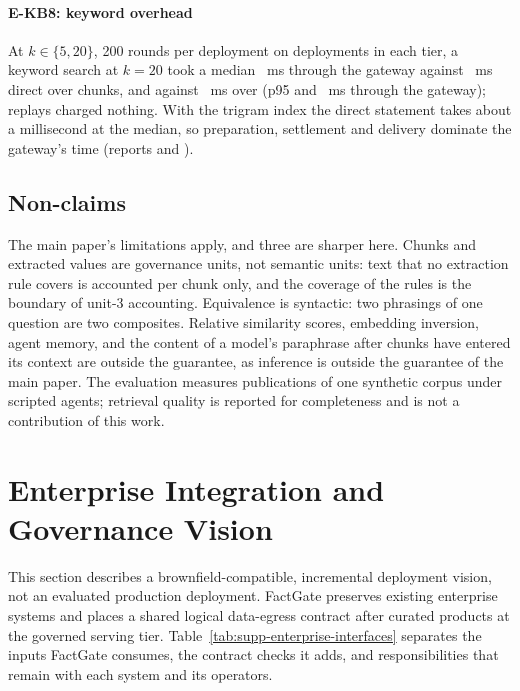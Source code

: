 \documentclass[journal,onecolumn]{IEEEtran}
\begin{document}
\paragraph{E-KB8: keyword overhead}
At $k\in\{5,20\}$, 200 rounds per deployment on \KbEkbEightFortyEightKDeployments{}
deployments in each tier, a keyword search at $k=20$ took a median
\KbEkbEightFortyEightKFactGateKTwentyNovelPFifty~ms through the gateway
against \KbEkbEightFortyEightKDirectKTwentyNovelPFifty~ms direct over
\KbEkbEightFortyEightKChunks{} chunks, and
\KbEkbEightNinetySixKFactGateKTwentyNovelPFifty{} against
\KbEkbEightNinetySixKDirectKTwentyNovelPFifty~ms over
\KbEkbEightNinetySixKChunks{} (p95 \KbEkbEightFortyEightKFactGateKTwentyNovelPNinetyFive{}
and \KbEkbEightNinetySixKFactGateKTwentyNovelPNinetyFive~ms through the gateway); replays charged
nothing. With the trigram index the direct statement takes about a
millisecond at the median, so preparation, settlement and delivery dominate
the gateway's time (reports \KbEkbEightFortyEightKReportDigest{} and
\KbEkbEightNinetySixKReportDigest).

\subsection{Non-claims}

The main paper's limitations apply, and three are sharper here. Chunks and
extracted values are governance units, not semantic units: text that no
extraction rule covers is accounted per chunk only, and the coverage of the
rules is the boundary of unit-3 accounting. Equivalence is syntactic: two
phrasings of one question are two composites. Relative similarity scores,
embedding inversion, agent memory, and the content of a model's paraphrase
after chunks have entered its context are outside the guarantee, as
inference is outside the guarantee of the main paper. The evaluation
measures publications of one synthetic corpus under scripted agents; retrieval quality
is reported for completeness and is not a contribution of this work.

\section{Enterprise Integration and Governance Vision}
\label{sec:supp-enterprise-vision}

This section describes a brownfield-compatible, incremental deployment vision,
not an evaluated production deployment. FactGate preserves existing enterprise
systems and places a shared logical data-egress contract after curated products
at the governed serving tier. Table~\ref{tab:supp-enterprise-interfaces}
separates the inputs FactGate consumes, the contract checks it adds, and
responsibilities that remain with each system and its operators.
\end{document}
